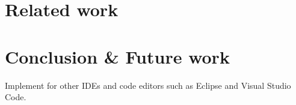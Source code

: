 \documentclass[sigconf]{acmart}
\begin{document}
\section{Related work} \label{sec:relatedWork}

\section{Conclusion \& Future work} \label{sec:conclusion}




Implement for other IDEs and code editors such as Eclipse \cite{desrivieresEclipsePlatformIntegrating2004} and Visual Studio Code.





\end{document}

